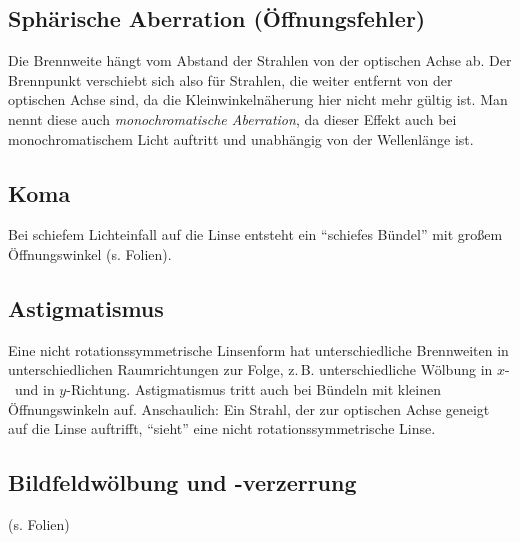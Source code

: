 \subsection{Sphärische Aberration (Öffnungsfehler)}
Die Brennweite hängt vom Abstand der Strahlen von der optischen Achse
ab. Der Brennpunkt verschiebt sich also für Strahlen, die weiter
entfernt von der optischen Achse sind, da die Kleinwinkelnäherung hier
nicht mehr gültig ist.
Man nennt diese auch \emph{monochromatische Aberration}, da dieser
Effekt auch bei monochromatischem Licht auftritt und unabhängig von
der Wellenlänge ist.


\subsection{Koma}
Bei schiefem Lichteinfall auf die Linse entsteht ein \enquote{schiefes
  Bündel} mit großem Öffnungswinkel (s. Folien).

\subsection{Astigmatismus}
Eine nicht rotationssymmetrische Linsenform hat unterschiedliche
Brennweiten in unterschiedlichen Raumrichtungen zur Folge,
z.\,B. unterschiedliche Wölbung in $x$-~und in $y$-Richtung.
Astigmatismus tritt auch bei Bündeln mit kleinen Öffnungswinkeln auf.
Anschaulich: Ein Strahl, der zur optischen Achse geneigt auf die Linse
auftrifft, \enquote{sieht} eine nicht rotationssymmetrische Linse.


\subsection{Bildfeldwölbung und -verzerrung}
(s. Folien)

